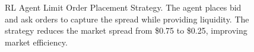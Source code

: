 \begin{figure}[h]
\caption{RL Agent Limit Order Placement Strategy. The agent places bid and ask orders to capture the spread while providing liquidity. The strategy reduces the market spread from \$0.75 to \$0.25, improving market efficiency.}
\label{fig:limit_order_placement}
\end{figure}
